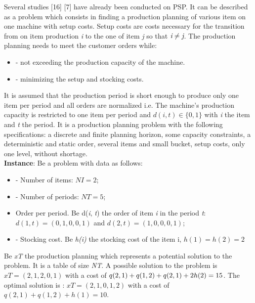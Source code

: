 \documentclass[twocolumn,10pt]{asme2ej}
\begin{document}
Several studies [16] [7] have already been conducted on PSP. It can be described as a problem which consists in finding a production planning of various item on one machine with setup costs. Setup costs are costs necessary for the transition from on item production \emph{i} to the one of item \emph{j} so that $ \emph{i} \neq \emph{j} $. The production planning needs to meet the customer orders while:
\begin{itemize}
  \item - not exceeding the production capacity of the machine.
  \item - minimizing the setup and stocking costs.
\end{itemize}
It is assumed that the production period is short enough to produce only one item per period and all orders are normalized i.e. The machine's production capacity is restricted to one item per period and $ d(i, t) \in \{0, 1\} $ with \emph{i} the item and \emph{t} the period. It is a production planning problem with the following specifications: a discrete and finite planning horizon, some capacity constraints, a deterministic and static order, several items and small bucket, setup costs, only one level, without shortage.\\

\textbf{Instance}: Be a problem with data as follows:
\begin{itemize}
    \item - Number of items: $ NI = 2 $;
    \item - Number of periods: $ NT = 5 $;
    \item Order per period. Be d(\emph{i}, \emph{t}) the order of item \emph{i} in the period \emph{t}: $ d(1, t ) = (0, 1, 0, 0, 1) $ and $ d(2, t) = (1, 0, 0, 0, 1)$; 
    \item - Stocking cost. Be \emph{h(i)} the stocking cost of the item i, $ h(1) = h(2) = 2 $
\end{itemize}

    Be \emph{xT} the production planning which represents a potential solution to the problem. It is a table of size \emph{NT}. A possible solution to the problem is $ xT = (2, 1, 2, 0, 1) $ with a cost of $ q(2, 1) + q(1, 2) + q(2, 1) + 2 \* h(2) = 15 $. The optimal solution is : $ xT = (2, 1, 0, 1, 2) $ with a cost of $ q(2, 1) + q(1, 2) + h(1) = 10 $.
\end{document}
